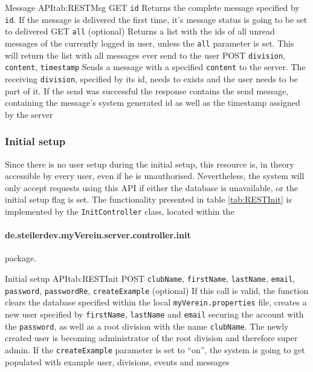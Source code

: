 \begin{RESTTable}{Message API}{tab:RESTMsg}
		{GET}
		{\texttt{id}}
		{Returns the complete message specified by \texttt{id}. If the message is delivered the first time, it's message status is going to be set to delivered}	
		{GET}
		{\texttt{all} (optional)}
		{Returns a list with the ids of all unread messages of the currently logged in user, unless the \texttt{all} parameter is set. This will return the list with all messages ever send to the user}
		{POST}
		{\texttt{division}, \texttt{content}, \texttt{timestamp}}
		{Sends a message with a specified \texttt{content} to the server. The receiving \texttt{division}, specified by its id, needs to exists and the user needs to be part of it. If the send was successful the response contains the send message, containing the message's system generated id as well as the timestamp assigned by the server}
\end{RESTTable}

\subsubsection{Initial setup}

Since there is no user setup during the initial setup, this resource is, in theory accessible by every user, even if he is unauthorised. Nevertheless, the system will only accept requests using this \gls{API} if either the database is unavailable, or the initial setup flag is set. The functionality presented in table \vref{tab:RESTInit} is implemented by the \texttt{InitController} class, located within the \paragraph{de.steilerdev.myVerein.server.controller.init} package.

\begin{RESTTable}{Initial setup API}{tab:RESTInit}
		{POST}
		{\texttt{clubName}, \texttt{firstName}, \texttt{lastName}, \texttt{email}, \texttt{password}, \texttt{passwordRe}, \texttt{createExample} (optional)}
		{If this call is valid, the function clears the database specified within the local \texttt{myVerein.properties} file, creates a new user specified by \texttt{firstName}, \texttt{lastName} and \texttt{email} securing the account with the \texttt{password}, as well as a root division with the name \texttt{clubName}. The newly created user is becoming administrator of the root division and therefore super admin. If the \texttt{createExample} parameter is set to \enquote{on}, the system is going to get populated with example user, divisions, events and messages}	
\end{RESTTable}

